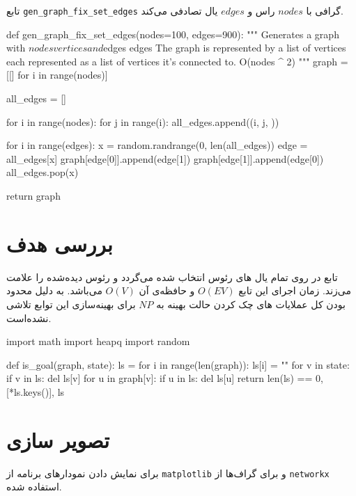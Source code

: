 تابع
\verb;gen_graph_fix_set_edges;
گرافی با
$nodes$
راس و  
$edges$
یال تصادفی می‌کند.

\begin{latin}
\begin{python}
def gen_graph_fix_set_edges(nodes=100, edges=900):
    """
    Generates a graph with $nodes vertices and $edges edges
    The graph is represented by a list of vertices each represented as a list of vertices it's connected to.
    O(nodes ^ 2)
    """
    graph = [[] for i in range(nodes)]

    all_edges = []
    
    for i in range(nodes):
        for j in range(i):
            all_edges.append((i, j, ))

    for i in range(edges):
        x = random.randrange(0, len(all_edges))
        edge = all_edges[x]
        graph[edge[0]].append(edge[1])
        graph[edge[1]].append(edge[0])
        all_edges.pop(x)

    return graph

\end{python}
\end{latin}

\section{بررسی هدف}
تابع
در 
 روی تمام یال ‌های رئوس انتخاب شده می‌گردد  و رئوس دیده‌شده را علامت می‌زند.
 زمان اجرای این تابع
 $O(EV)$
 و حافظه‌ی آن
 $O(V)$
  می‌باشد.
 به دلیل محدود بودن کل عملایات های چک کردن حالت بهینه به
 $NP$
 برای بهینه‌سازی این توابع تلاشی نشده‌است.
 
\begin{latin}
\begin{python}
import math
import heapq
import random

def is_goal(graph, state):
    ls = {}
    for i in range(len(graph)):
        ls[i] = ""
    for v in state:
        if v in ls:
            del ls[v]
        for u in graph[v]:
            if u in ls:
                del ls[u]
    return len(ls) == 0, [*ls.keys()], ls

 \end{python}
 \end{latin}

 
 \section{تصویر سازی}
 برای نمایش دادن نمودارهای برنامه از
\verb;matplotlib;
 و برای گراف‌ها از
\verb;networkx;
استفاده شده.
 
